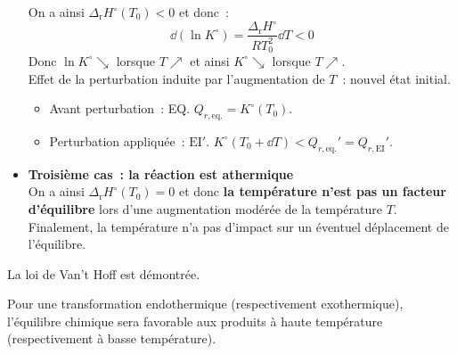 \documentclass{article}
\newcommand{\Dr}{\Delta_{\mathrm{r}}}
\newcommand{\EI}{\mathrm{EI}}
\newcommand{\equi}{\text{eq.}}
\begin{document}
\begin{tableau}
\begin{itemize}
        On a ainsi $\Dr H^\circ(T_0) < 0$ et donc~:
        $$\dd(\ln K^\circ) = \frac{\Dr H^\circ}{RT_0^2}\dd{T} <0$$
        Donc $\ln K^\circ \searrow$ lorsque $T \nearrow$ et ainsi $K^\circ \searrow$ lorsque $T\nearrow$.\\
        Effet de la perturbation induite par l'augmentation de $T$~: nouvel état initial.
        \begin{itemize}
            \item Avant perturbation~: EQ. $Q_{r,\equi} = K^\circ(T_0)$.
            \item Perturbation appliquée~: $\EI'$. $K^\circ(T_0+\dd{T})<Q_{r,\equi}'=Q_{r,\EI}'$.
        \end{itemize}
        \begin{figure}[H]
            \centering
        \end{figure}
        \item \textbf{Troisième cas~: la réaction est athermique}\\
        On a ainsi $\Dr H^\circ(T_0) = 0$ et donc \textbf{la température n'est pas un facteur d'équilibre} lors d'une augmentation modérée de la température $T$. Finalement, la température n'a pas d'impact sur un éventuel déplacement de l'équilibre.
    \end{itemize}
    La loi de Van't Hoff est démontrée.
\end{tableau}
    \begin{important}[Conséquence]
        Pour une transformation endothermique (respectivement exothermique), l’équilibre chimique sera favorable aux produits à haute température (respectivement à basse température).
    \end{important}
\end{document}

